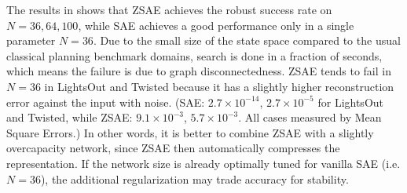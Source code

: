 The results in  shows that ZSAE achieves the robust success rate on $N=36,64,100$,
while SAE achieves a good performance only in a single parameter $N=36$.
% 
Due to the small size of the state space compared to the usual classical planning benchmark domains,
search is done in a fraction of seconds, which means the failure is due to graph disconnectedness.
ZSAE tends to fail in $N=36$ in LightsOut and Twisted because it has a slightly higher reconstruction error
against the input with noise.
(SAE: $2.7\times 10^{-14}$, $2.7\times 10^{-5}$ for LightsOut and Twisted, while
ZSAE: $9.1\times 10^{-3}$, $5.7\times 10^{-3}$.
All cases measured by Mean Square Errors.)
In other words, it is better to combine ZSAE with a slightly overcapacity network,
since ZSAE then automatically compresses the representation.
If the network size is already optimally tuned for vanilla SAE (i.e. $N=36$),
the additional regularization may trade accuracy for stability.

